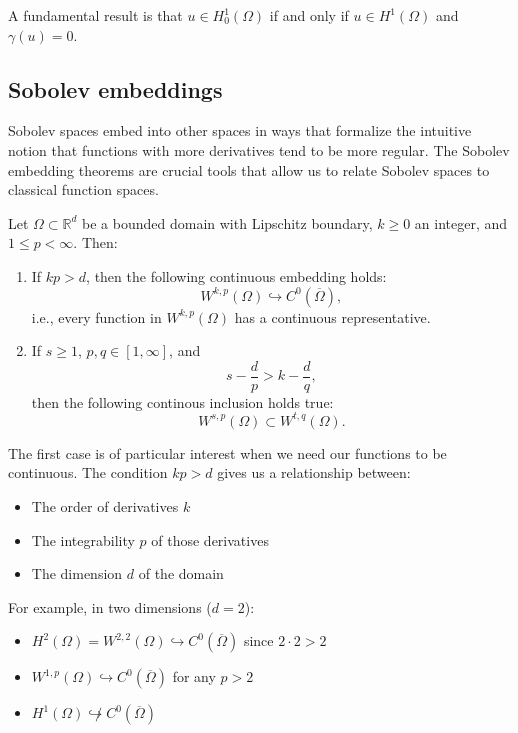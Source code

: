 A fundamental result is that $u \in H_0^1(\Omega)$ if and only if $u \in H^1(\Omega)$ and $\gamma(u) = 0$.

\subsection{Sobolev embeddings}

Sobolev spaces embed into other spaces in ways that formalize the intuitive notion that functions with more derivatives tend to be more regular. The Sobolev embedding theorems are crucial tools that allow us to relate Sobolev spaces to classical function spaces.

\begin{theorem}
Let $\Omega \subset \mathbb{R}^d$ be a bounded domain with Lipschitz boundary, $k \geq 0$ an integer, and $1 \leq p < \infty$. Then:

\begin{enumerate}
  \item If $kp > d$, then the following continuous embedding holds:
  \[
  W^{k,p}(\Omega) \hookrightarrow C^{0}(\overline{\Omega}),
  \]
  i.e., every function in $W^{k,p}(\Omega)$ has a continuous representative.
  
  \item If $s \geq 1$, $p,q \in [1, \infty]$, and 
  \[
  s - \frac{d}{p} > k - \frac{d}{q},
  \]
  then the following continous inclusion holds true:
  \[ 
    W^{s,p}(\Omega) \subset W^{t,q}(\Omega).
  \]
\end{enumerate}
\end{theorem}

The first case is of particular interest when we need our functions to be continuous. The condition $kp > d$ gives us a relationship between:

\begin{itemize}
  \item The order of derivatives $k$
  \item The integrability $p$ of those derivatives
  \item The dimension $d$ of the domain
\end{itemize}

For example, in two dimensions ($d=2$):
\begin{itemize}
  \item $H^2(\Omega) = W^{2,2}(\Omega) \hookrightarrow C^0(\overline{\Omega})$ since $2 \cdot 2 > 2$
  \item $W^{1,p}(\Omega) \hookrightarrow C^0(\overline{\Omega})$ for any $p > 2$
  \item $H^{1}(\Omega) \not\hookrightarrow C^0(\overline{\Omega})$
\end{itemize}


